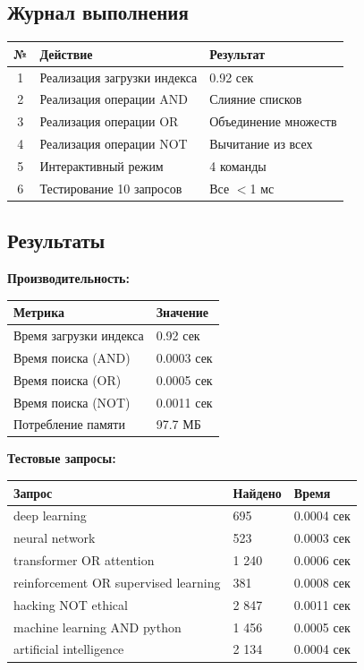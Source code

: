 \documentclass[a4paper, 12pt]{article}
\begin{document}
\subsection*{Журнал выполнения}
\begin{table}[h]
\centering
\begin{tabular}{|c|l|l|}
\hline
\textbf{№} & \textbf{Действие} & \textbf{Результат} \\ \hline
1 & Реализация загрузки индекса & 0.92 сек \\ \hline
2 & Реализация операции AND & Слияние списков \\ \hline
3 & Реализация операции OR & Объединение множеств \\ \hline
4 & Реализация операции NOT & Вычитание из всех \\ \hline
5 & Интерактивный режим & 4 команды \\ \hline
6 & Тестирование 10 запросов & Все $<$1 мс \\ \hline
\end{tabular}
\end{table}

\subsection*{Результаты}
\textbf{Производительность:}
\begin{table}[h]
\begin{tabular}{|l|l|}
\hline
\textbf{Метрика} & \textbf{Значение} \\ \hline
Время загрузки индекса & 0.92 сек \\ \hline
Время поиска (AND) & 0.0003 сек \\ \hline
Время поиска (OR) & 0.0005 сек \\ \hline
Время поиска (NOT) & 0.0011 сек \\ \hline
Потребление памяти & 97.7 МБ \\ \hline
\end{tabular}
\end{table}

\textbf{Тестовые запросы:}
\begin{table}[h]
\begin{tabular}{|l|l|l|}
\hline
\textbf{Запрос} & \textbf{Найдено} & \textbf{Время} \\ \hline
deep learning & 695 & 0.0004 сек \\ \hline
neural network & 523 & 0.0003 сек \\ \hline
transformer OR attention & 1 240 & 0.0006 сек \\ \hline
reinforcement OR supervised learning & 381 & 0.0008 сек \\ \hline
hacking NOT ethical & 2 847 & 0.0011 сек \\ \hline
machine learning AND python & 1 456 & 0.0005 сек \\ \hline
artificial intelligence & 2 134 & 0.0004 сек \\ \hline
\end{tabular}
\end{table}
\end{document}
